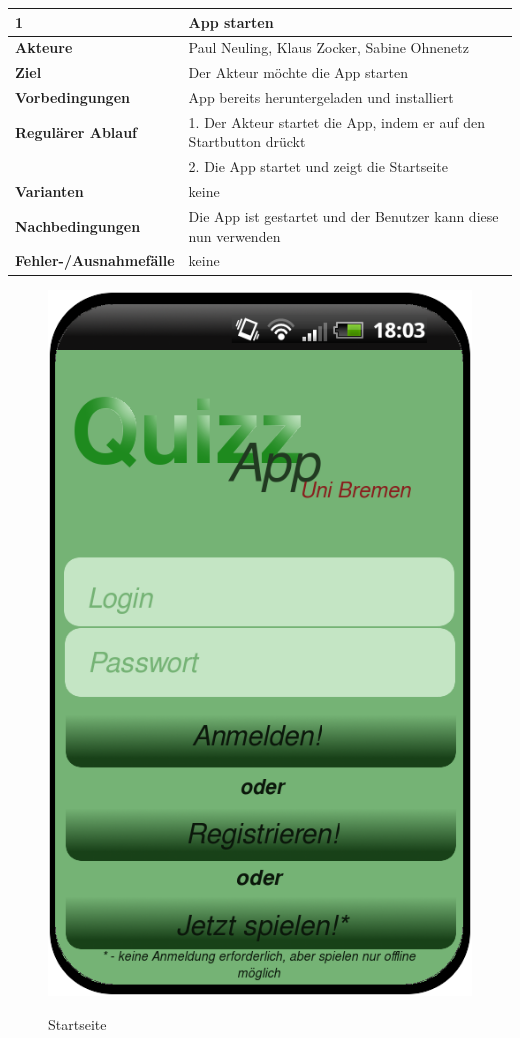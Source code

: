 \documentclass[fontsize=12pt,paper=a4,twoside]{scrartcl}
\begin{document}
\begin{table}
	[H] \label{1} 
	\begin{tabular}
		{|l|p{10cm}|} \hline \textbf{1} & \textbf{App starten} \\
		\hline \textbf{Akteure} & Paul Neuling, Klaus Zocker, Sabine Ohnenetz\\
		\hline \textbf{Ziel} & Der Akteur möchte die App starten \\
		\hline \textbf{Vorbedingungen} & App bereits heruntergeladen und installiert \\
		\hline \textbf{Regulärer Ablauf} & 1. Der Akteur startet die App, indem er auf den Startbutton drückt \\
		&2. Die App startet und zeigt die Startseite \\
		\hline \textbf{Varianten} & keine \\
		\hline \textbf{Nachbedingungen} & Die App ist gestartet und der Benutzer kann diese nun verwenden\\
		\hline \textbf{Fehler-/Ausnahmefälle} & keine \\
		\hline 
	\end{tabular}
\end{table}

\begin{figure}
	[H] \caption{Startseite} 
	\includegraphics[width=0.5
	\textwidth]{Bilder/QuizzLoginRegister.png} \label{pic:Startseite} 
\end{figure}
\end{document}
